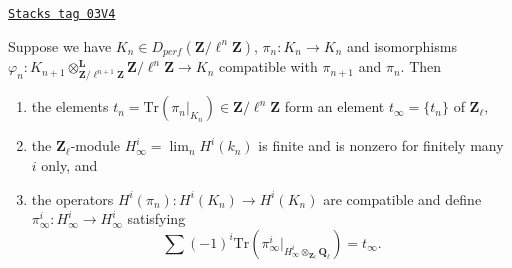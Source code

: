 \begin{lemma}
\label{trace-lemma-piece-together}
\href{https://stacks.math.columbia.edu/tag/03V4}{\texttt{Stacks tag 03V4}}

Suppose we have
$K_n\in D_{perf}(\mathbf{Z}/\ell^n\mathbf{Z})$, $\pi_n : K_n\to K_n$
and isomorphisms
$\varphi_n :
K_{n+1} \otimes^\mathbf{L}_{\mathbf{Z}/\ell^{n+1}\mathbf{Z}}
\mathbf{Z}/\ell^n\mathbf{Z}
\to K_n$
compatible with $\pi_{n+1}$ and $\pi_n$. Then
\begin{enumerate}
\item
the elements $t_n = \text{Tr}(\pi_n |_{K_n})\in \mathbf{Z}/\ell^n\mathbf{Z}$
form an element $t_\infty = \{t_n\}$ of $\mathbf{Z}_\ell$,
\item
the $\mathbf{Z}_\ell$-module $H_\infty^i = \lim_n H^i(k_n)$ is finite and
is nonzero for finitely many $i$ only, and
\item
the operators $H^i(\pi_n): H^i(K_n)\to H^i(K_n)$ are compatible and define
$\pi_\infty^i : H_\infty^i\to H_\infty^i$ satisfying
$$
\sum (-1)^i \text{Tr}(
\pi_\infty^i |_{H_\infty^i \otimes_{\mathbf{Z}_\ell}\mathbf{Q}_\ell}) =
t_\infty.
$$
\end{enumerate}
\end{lemma}


